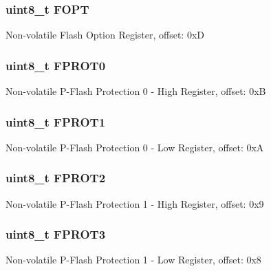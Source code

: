 \subsubsection[{F\+O\+P\+T}]{\setlength{\rightskip}{0pt plus 5cm}uint8\+\_\+t F\+O\+P\+T}\label{struct_n_v___mem_map_ad136314504ac1baf93f6254b0ac13ee6}
Non-\/volatile Flash Option Register, offset\+: 0x\+D \hypertarget{struct_n_v___mem_map_a36693d749fac8e3f218744ab5da5cda1}{}
\subsubsection[{F\+P\+R\+O\+T0}]{\setlength{\rightskip}{0pt plus 5cm}uint8\+\_\+t F\+P\+R\+O\+T0}\label{struct_n_v___mem_map_a36693d749fac8e3f218744ab5da5cda1}
Non-\/volatile P-\/\+Flash Protection 0 -\/ High Register, offset\+: 0x\+B \hypertarget{struct_n_v___mem_map_a99308b5052058ad416c35ce9f82507f5}{}
\subsubsection[{F\+P\+R\+O\+T1}]{\setlength{\rightskip}{0pt plus 5cm}uint8\+\_\+t F\+P\+R\+O\+T1}\label{struct_n_v___mem_map_a99308b5052058ad416c35ce9f82507f5}
Non-\/volatile P-\/\+Flash Protection 0 -\/ Low Register, offset\+: 0x\+A \hypertarget{struct_n_v___mem_map_adfb9669bc3184da7e4b49c320970b1df}{}
\subsubsection[{F\+P\+R\+O\+T2}]{\setlength{\rightskip}{0pt plus 5cm}uint8\+\_\+t F\+P\+R\+O\+T2}\label{struct_n_v___mem_map_adfb9669bc3184da7e4b49c320970b1df}
Non-\/volatile P-\/\+Flash Protection 1 -\/ High Register, offset\+: 0x9 \hypertarget{struct_n_v___mem_map_a84a4810c0a2da0b5c5a6205e551e0bf6}{}
\subsubsection[{F\+P\+R\+O\+T3}]{\setlength{\rightskip}{0pt plus 5cm}uint8\+\_\+t F\+P\+R\+O\+T3}\label{struct_n_v___mem_map_a84a4810c0a2da0b5c5a6205e551e0bf6}
Non-\/volatile P-\/\+Flash Protection 1 -\/ Low Register, offset\+: 0x8 \hypertarget{struct_n_v___mem_map_a4c7b35caf2d96b1c13a8cb7e15445dcb}{}
